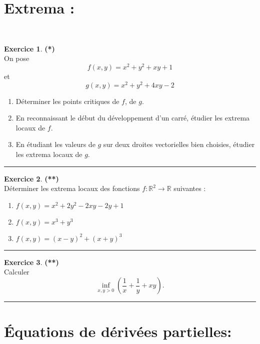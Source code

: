 \documentclass[a4paper,11pt]{article}
\theoremstyle{definition}
\newtheorem{exo}{Exercice} %
\begin{document}
\section*{Extrema :}\hfill\\%


\begin{minipage}{1\linewidth}\begin{minipage}[t]{0.48\linewidth}\raggedright
		
		\begin{exo}\textbf{(*)}\quad\\[0.2cm]
			On pose $$f(x,y)=x^2+y^2+xy+1$$ et $$g(x,y)=x^2+y^2+4xy-2$$
			\begin{enumerate}
				\item Déterminer les points critiques de $f$, de $g$.
				\item En reconnaissant le début du développement d'un carré, étudier les extrema locaux de $f$.
				\item En étudiant les valeurs de $g$ sur deux droites vectorielles bien choisies, étudier les extrema locaux de $g$.
			\end{enumerate}
			
			
			\centering\rule{1\linewidth}{0.6pt}\end{exo}
		
		
		
		
	\end{minipage}\hfill\vrule\hfill\begin{minipage}[t]{0.48\linewidth}\raggedright
		
	\begin{exo}\textbf{(**)}\quad\\[0.2cm]
	Déterminer les extrema locaux des fonctions $f:\mathbb{R}^2  \to \mathbb{R}$ suivantes :
	\begin{enumerate}
		\item $f(x,y) = x^2  + 2y^2  - 2xy - 2y + 1$
		\item $f(x,y) = x^3  + y^3 $
		\item $f(x,y) = (x - y)^2  + (x + y)^3 $
	\end{enumerate}
	
	\centering\rule{1\linewidth}{0.6pt}\end{exo}

	\begin{exo}\textbf{(**)}\quad\\[0.2cm]
		
		Calculer $$\displaystyle \underset{x,y>0}{\inf}\left(\dfrac{1}{x} + \dfrac{1}{y} +xy\right).$$
		
		\centering\rule{1\linewidth}{0.6pt}\end{exo}
		
		
\end{minipage}\end{minipage} \section*{Équations de dérivées partielles:}\hfill\\%
\end{document}

